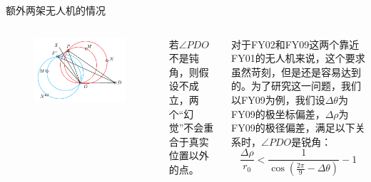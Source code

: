 \documentclass[aspectratio=169]{beamer}
\begin{document}
\begin{frame}{额外两架无人机的情况}
    \begin{columns}
        \begin{figure}[!ht]
            \centering
            \includegraphics[width = \textwidth]{图片/两架无人机情况.pdf}
        \end{figure}

        若$\angle PDO$不是钝角，则假设不成立，两个“幻觉”不会重合于真实位置以外的点。

        对于FY02和FY09这两个靠近FY01的无人机来说，这个要求虽然苛刻，但是还是容易达到的。为了研究这一问题，我们以FY09为例，我们设$\Delta\theta$为FY09的极坐标偏差，$\Delta\rho$为FY09的极径偏差，满足以下关系时，$\angle PDO$是锐角：
        \begin{equation}
            \frac{\Delta\rho}{r_0} < \frac{1}{\cos\left(\frac{2\pi}{9}-\Delta\theta\right)} - 1
        \end{equation}
    \end{columns}
\end{frame}
\end{document}
